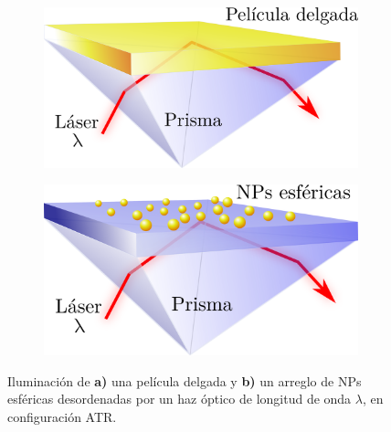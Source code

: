 	\begin{figure}[h!]\vspace{1em}\centering
	\begin{subfigure}{.05\textwidth}\vspace{-3.5cm}\caption{}\label{sfig:ATRfilm}\end{subfigure}
	\begin{subfigure}{.43\textwidth} 
		\includegraphics[scale=.225]{0-4-Introduccion/figs/SPP-3D.png}
		\end{subfigure}
	\begin{subfigure}{.05\textwidth}\vspace{-3.5cm}\caption{}\label{sfig:ATRNP}	\end{subfigure}
	\begin{subfigure}{.43\textwidth}  
		\includegraphics[scale=.225]{0-4-Introduccion/figs/NPs-3D.png}
	\end{subfigure} 
	\caption{ Iluminación de \textbf{a)} una película delgada y \textbf{b)} un arreglo de NPs esf\'ericas desordenadas por un haz óptico de longitud de onda $\lambda$, en configuraci\'on ATR.}	\label{fig:ATR1}	
	\end{figure}	
	

